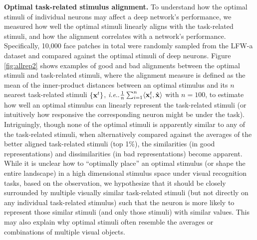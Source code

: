 \documentclass[fleqn]{article} %
\makeatletter
\DeclareRobustCommand\onedot{\futurelet\@let@token\@onedot}
\def\@onedot{\ifx\@let@token.\else.\null\fi\xspace}
\def\ie{\emph{i.e}\onedot} \def\Ie{\emph{I.e}\onedot}
\makeatother
\begin{document}
{\bf Optimal \vs task-related stimulus alignment.}
To understand how the optimal stimuli of individual neurons may affect a deep network's performance, we {measured} how well the optimal stimuli linearly aligns with the task-related stimuli, and how the alignment correlates with a network's performance.
Specifically, 10,000 face patches in total {were} randomly sampled from the LFW-a dataset and compared against the optimal stimuli of deep neurons.
Figure \ref{fig:allrep2} shows examples of good and bad alignments between the optimal stimuli and task-related stimuli, where the alignment measure is defined as the mean of the inner-product distances between an optimal stimulus and its $n$ nearest task-related stimuli $\left\lbrace {\bf{x}}^{t} \right\rbrace$, \ie $\frac{1}{n}\sum_{i=1}^{n} \langle {\bf{x}}^{t}_{i} , \hat{{\bf{x}}} \rangle$ with $n=100$, to estimate how well an optimal stimulus can linearly represent the task-related stimuli (or intuitively how responsive the corresponding neuron might be under the task).
Intriguingly, though none of the optimal stimuli is apparently similar to any of the task-related stimuli, when alternatively compared against the averages of the better aligned task-related stimuli (top 1\%), the similarities (in good representations) and dissimilarities (in bad representations) become apparent.
While it is unclear how to ``optimally place'' an optimal stimulus (or shape the entire landscape) in a high dimensional stimulus space under visual recognition tasks, based on the observation, we hypothesize that it should be closely surrounded by multiple visually similar task-related stimuli (but not directly on any individual task-related stimulus) such that the neuron is more likely to represent those similar stimuli (and only those stimuli) with similar values.
This may also explain why optimal stimuli often resemble the averages \cite{le2012building} or combinations \cite{simonyan2013deep} of multiple visual objects.

\end{document}
